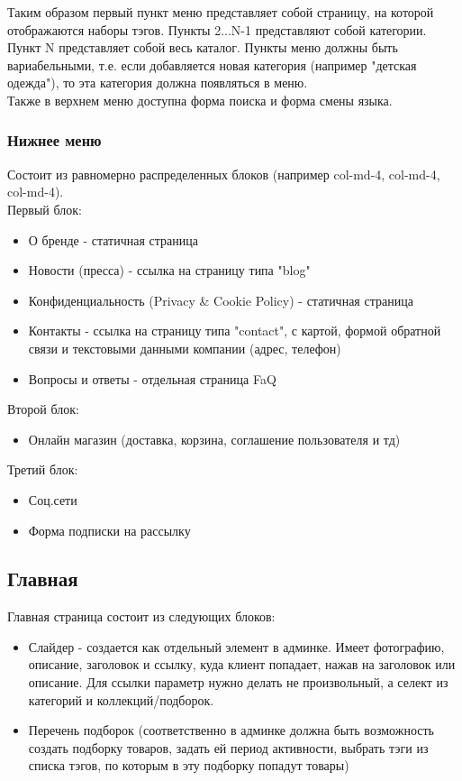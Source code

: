 \documentclass[DIV=calc, paper=a4, fontsize=11pt]{scrartcl} %
\begin{document}
Таким образом первый пункт меню представляет собой страницу, на которой отображаются наборы тэгов. Пункты 2...N-1 представляют собой категории. Пункт N представляет собой весь каталог. Пункты меню должны быть вариабельными, т.е. если добавляется новая категория (например "детская одежда"), то эта категория должна появляться в меню.
\\[0.5cm]
Также в верхнем меню доступна форма поиска и форма смены языка.

\subsubsection{Нижнее меню}
Состоит из равномерно распределенных блоков (например col-md-4, col-md-4, col-md-4). 
\\[0.5cm]
Первый блок:
\begin{itemize}
	\item О бренде - статичная страница
	\item Новости (пресса) - ссылка на страницу типа "blog"
	\item Конфиденциальность (Privacy & Cookie Policy) - статичная страница
	\item Контакты - ссылка на страницу типа "contact", с картой, формой обратной связи и текстовыми данными компании (адрес, телефон)
	\item Вопросы и ответы - отдельная страница FaQ
\end{itemize}

Второй блок:
\begin{itemize}
	\item Онлайн магазин (доставка, корзина, соглашение пользователя и тд)
\end{itemize}

Третий блок:
\begin{itemize}
	\item Соц.сети
	\item Форма подписки на рассылку
\end{itemize}


\subsection{Главная}
Главная страница состоит из следующих блоков:
\begin{itemize}
	\item Слайдер - создается как отдельный элемент в админке. Имеет фотографию, описание, заголовок и ссылку, куда клиент попадает, нажав на заголовок или описание. Для ссылки параметр нужно делать не произвольный, а селект из категорий и коллекций/подборок.
	\item Перечень подборок (соответственно в админке должна быть возможность создать подборку товаров, задать ей период активности, выбрать тэги из списка тэгов, по которым в эту подборку попадут товары)
\end{itemize}
\end{document}
